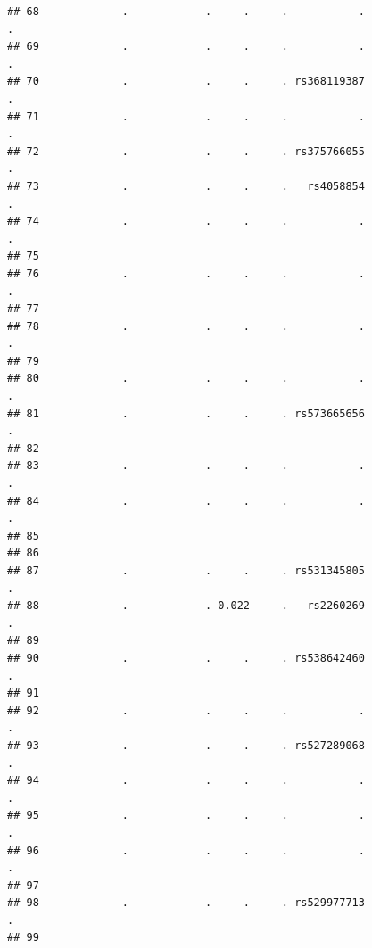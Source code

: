 \documentclass[
]{article}
\begin{document}
\begin{verbatim}
## 68             .            .     .     .           .                        .
## 69             .            .     .     .           .                        .
## 70             .            .     .     . rs368119387                        .
## 71             .            .     .     .           .                        .
## 72             .            .     .     . rs375766055                        .
## 73             .            .     .     .   rs4058854                        .
## 74             .            .     .     .           .                        .
## 75                                                                            
## 76             .            .     .     .           .                        .
## 77                                                                            
## 78             .            .     .     .           .                        .
## 79                                                                            
## 80             .            .     .     .           .                        .
## 81             .            .     .     . rs573665656                        .
## 82                                                                            
## 83             .            .     .     .           .                        .
## 84             .            .     .     .           .                        .
## 85                                                                            
## 86                                                                            
## 87             .            .     .     . rs531345805                        .
## 88             .            . 0.022     .   rs2260269                        .
## 89                                                                            
## 90             .            .     .     . rs538642460                        .
## 91                                                                            
## 92             .            .     .     .           .                        .
## 93             .            .     .     . rs527289068                        .
## 94             .            .     .     .           .                        .
## 95             .            .     .     .           .                        .
## 96             .            .     .     .           .                        .
## 97                                                                            
## 98             .            .     .     . rs529977713                        .
## 99                                                                            

\end{verbatim}
\end{document}
